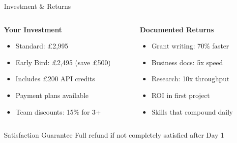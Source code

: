 \documentclass{beamer}
\begin{document}
\begin{frame}{Investment \& Returns}
\begin{columns}[T]
\begin{column}{0.5\textwidth}
\textbf{Your Investment}
\begin{itemize}
\item Standard: £2,995
\item Early Bird: £2,495 (save £500)
\item Includes £200 API credits
\item Payment plans available
\item Team discounts: 15\% for 3+
\end{itemize}
\end{column}
\begin{column}{0.5\textwidth}
\textbf{Documented Returns}
\begin{itemize}
\item Grant writing: 70\% faster
\item Business docs: 5x speed
\item Research: 10x throughput
\item ROI in first project
\item Skills that compound daily
\end{itemize}
\end{column}
\end{columns}
\vspace{1em}
\begin{alertblock}{Satisfaction Guarantee}
Full refund if not completely satisfied after Day 1
\end{alertblock}
\end{frame}
\end{document}
